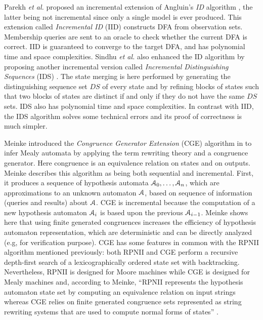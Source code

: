 Parekh \emph{et al.} \cite{parekh98} proposed an incremental extension
of Angluin's \textit{ID} algorithm \cite{ANGLUIN198176}, the
latter being not incremental since only a single model is
ever produced. This extension called \textit{Incremental ID}
(IID) constructs DFA from observation sets. Membership queries
are sent to an oracle to check whether the current DFA is
correct. IID is guaranteed to converge to the target DFA, and has
polynomial time and space complexities. Sindhu \emph{et al.} also
enhanced the ID algorithm by proposing another incremental
version called \textit{Incremental Distinguishing Sequences}
(IDS) \cite{journals/corr/abs-1206-2691}. The state merging is
here performed by generating the distinguishing sequence set $DS$
of every state and by refining blocks of states such that two
blocks of states are distinct if and only if they do not have the
same $DS$ sets. IDS also has polynomial time and space
complexities. In contrast with IID, the IDS algorithm solves some
technical errors and its proof of correctness is much simpler.

Meinke introduced the \textit{Congruence Generator Extension}
(CGE) algorithm in \cite{meinkeCGE} to infer Mealy automata by
applying the term rewriting theory and a congruence generator.
Here congruence is an equivalence relation on states and on
outputs. Meinke describes this algorithm as being both sequential
and incremental. First, it produces a sequence of hypothesis
automata $\EuScript{A}_0, \dots, \EuScript{A}_n$, which are
approximations to an unknown automaton $\EuScript{A}$, based on
sequence of information (queries and results) about
$\EuScript{A}$. CGE is incremental because the computation
of a new hypothesis automaton $\EuScript{A}_i$ is based upon the
previous $\EuScript{A}_{i-1}$. Meinke shows here that using
finite generated congruences increases the efficiency of
hypothesis automaton representation, which are deterministic
and can be directly analyzed (e.g, for verification purpose). CGE
has some features in common with the RPNII algorithm mentioned
previously: both RPNII and CGE perform a recursive depth-first
search of a lexicographically ordered state set with
backtracking. Nevertheless, RPNII is designed for Moore machines
while CGE is designed for Mealy machines and, according to
Meinke, \enquote{RPNII represents the hypothesis automaton state
set by computing an equivalence relation on input strings
whereas CGE relies on finite generated congruence sets
represented as string rewriting systems that are used to
compute normal forms of states} \cite{meinkeCGE}.

